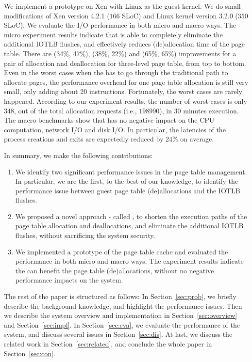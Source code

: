 We implement a prototype on Xen with Linux as the guest kernel. We do small modifications of Xen version 4.2.1 ($166$ SLoC) and Linux kernel version 3.2.0 ($350$ SLoC).
We evaluate the I/O performance in both micro and macro ways.
The micro experiment results indicate that \name is able to completely eliminate the additional IOTLB flushes, and effectively reduces (de)allocation time of the page table.
There are (34\%, 47\%), (38\%, 22\%) and (65\%, 65\%) improvements for a pair of allocation and deallocation for three-level page table, from top to bottom. 
Even in the worst cases when the \name has to go through the traditional path to allocate pages, the performance overhead for one page table allocation is still very small, only adding about 20 instructions. Fortunately, the worst cases are rarely happened. According to our experiment results, the number of worst cases is only $348$, out of the total allocation requests (i.e., $198990$), in 30 minutes execution.  
The macro benchmarks show that \name has no negative impact on the CPU computation, network I/O and disk I/O.
In particular, the latencies of the process creations and exits are expectedly reduced by 24\% on average.

In summary, we make the following contributions:
\begin{enumerate}
\item We identify two significant performance issues in the page table management. In particular, we are the first, to the best of our knowledge, to identify the performance issue between guest page table (de)allocations and the IOTLB flushes.
\item We proposed a novel approach - called \name, to shorten the execution paths of the page table allocation and deallocations, and eliminate the additional IOTLB flushes, without sacrificing the system security.
\item We implemented a prototype of the page table cache and evaluated the performance in both micro and macro ways. The experiment results indicate the \name can benefit the page table (de)allocations, without no negative performance impacts on the system.
\end{enumerate}

The rest of the paper is structured as follows: In Section~\ref{sec:prob}, we briefly describe the background knowledge, and highlight the performance issues. Then we describe the system overview and implementation in Section~\ref{sec:overview} and Section~\ref{sec:impl}. In Section~\ref{sec:eva}, we evaluate the performance of the \name system, and discuss several issues in Section~\ref{sec:dis}. At last, we discuss the related work in Section~\ref{sec:related}, and conclude the whole paper in Section~\ref{sec:con}.

